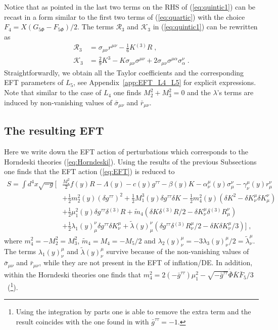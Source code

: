 \documentclass[a4paper,11pt]{article}
\numberwithin{equation}{section}
\begin{document}
Notice that as pointed in \cite{Gleyzes:2013ooa} the last two terms on the RHS of (\ref{eq:quintic1}) can be recast in a form similar to the first two terms of (\ref{eq:quartic}) with the choice $F_4 = X(G_{5\Phi} - F_{5\Phi})/2$. The terms $\mathcal{R}_3$ and $\mathcal{K}_3$ in (\ref{eq:quintic1}) can be rewritten as
 \begin{align}
\mathcal{R}_3 &=  \sigma_{\mu\nu} r^{\mu\nu} - \frac{1}{6} K {}^{(3)}\!R \;, \\
\mathcal{K}_3 &= \frac{2}{9} K^3 - K \sigma_{\mu\nu}\sigma^{\mu\nu} + 2 \sigma_{\mu\nu} \sigma^{\mu\alpha} \sigma^\nu_\alpha \;.
 \end{align} 
Straightforwardly, we obtain all the Taylor coefficients and the corresponding EFT parameters of $L_5$, see Appendix~\ref{app:EFT_L4_L5} for explicit expressions. Note that similar to the case of $L_4$ one finds $M_2^2 + M_3^2 = 0$ and the $\lambda$'s terms are induced by non-vanishing values of $\bar{\sigma}_{\mu\nu}$ and $\bar{r}_{\mu\nu}$.  

\subsection{The resulting EFT}
Here we write down the EFT action of perturbations which corresponds to the Horndeski theories (\ref{eq:Horndeski}). Using the results of the previous Subsections one finds that the EFT action (\ref{eq:EFT}) is reduced to 
\begin{align}
S = \int d^4x \sqrt{-g} \bigg[&\frac{M^2_\star}{2}f(y)R - \Lambda(y) - c(y)g^{\tau\tau} - \beta(y) K  - \alpha^\mu_{\nu}(y)\sigma^{\nu}_\mu - \gamma^\mu_{\nu}(y)r^{\nu}_\mu \nonumber \\ 
& + \frac{1}{2} m_2^2(y) (\delta g^{\tau\tau})^2  + \frac{1}{2} M_1^3(y) \delta g^{\tau\tau} \delta K - \frac{1}{2} m_4^2(y) (\delta K^2 - \delta K^\mu_\nu \delta K^\nu_\mu)  \nonumber \\ & + \frac{1}{2}\mu_1^2(y) \delta g^{\tau\tau} \delta {}^{(3)}\!R  + \tilde{m}_4 (\delta K \delta {}^{(3)}\!R/2 
- \delta K^\mu_\nu \delta {}^{(3)}\!R^\nu_\mu) \nonumber \\ & + \frac{1}{2} \lambda_1(y)^\nu_\mu \delta g^{\tau\tau} \delta K^\mu_\nu +  \tilde{\lambda}(y)^\nu_\mu (\delta g^{\tau\tau} \delta {}^{(3)}\!R^\mu_\nu/2 -  \delta K \delta K^\mu_\nu /3)  \bigg] \;, \label{eq:EFT_Horn}
\end{align}
where $m_4^2 = -M_2^2 = M_3^2$, $\tilde{m}_4 = M_4 = -M_5/2$ and $\lambda_2(y)^\mu_\nu = -3 \lambda_3(y)^\mu_\nu/2 = \tilde{\lambda}^\mu_\nu$. The terms $\lambda_1(y)^\mu_\nu$ and $\tilde{\lambda}(y)^\mu_\nu$ survive because of the non-vanishing values of $\bar{\sigma}_{\mu\nu}$ and $\bar{r}_{\mu\nu}$, while they are not present in the EFT of inflation/DE. In addition, within the Horndeski theories one finds that $m_4^2 = 2(-\bar{g}^{\tau\tau}) \mu_1^2 - \sqrt{-\bar{g}^{\tau\tau}} \dot{\bar{\Phi}} \bar{K} \bar{F}_5 /3$~(\footnote{Using the integration by parts one is able to remove the extra term and the result coincides with the one found in \cite{Gleyzes:2013ooa} with $\bar{g}^{\tau\tau} = -1$.}).  
\end{document}
